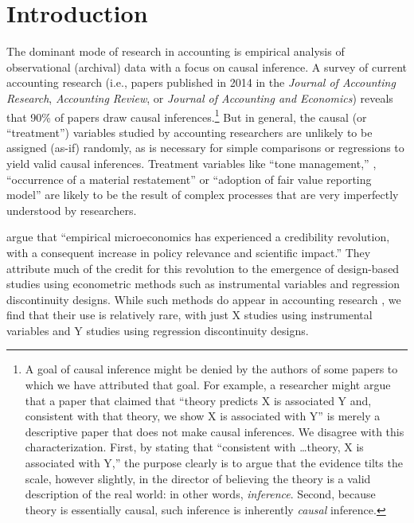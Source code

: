 \section{Introduction}

The dominant mode of research in accounting is empirical analysis of observational (archival) data with a focus on causal inference. A survey of current accounting research (i.e., papers published in 2014 in the \textit{Journal of Accounting Research}, \textit{Accounting Review}, or \textit{Journal of Accounting and Economics}) reveals that 90\% of papers draw causal inferences.\footnote{A goal of causal inference might be denied by the authors of some papers to which we have attributed that goal. 
For example, a researcher might argue that a paper that claimed that ``theory predicts X is associated Y and, consistent with that theory, we show X is associated with Y'' is merely a descriptive paper that does not make causal inferences. 
We disagree with this characterization. 
First, by stating that ``consistent with \dots theory, X is associated with Y,'' the purpose clearly is to argue that the evidence tilts the scale, however slightly, in the director of believing the theory is a valid description of the real world: in other words, \emph{inference}. 
Second, because theory is essentially causal, such inference is inherently \emph{causal} inference.} 
But in general, the causal (or ``treatment'') variables studied by accounting researchers are unlikely to be assigned (as-if) randomly, as is necessary for simple comparisons or regressions to yield valid causal inferences. Treatment variables like ``tone management,'' \citep{Huang:2014cs}, ``occurrence of a material restatement'' \citep{Chen:2014ji} or ``adoption of fair value reporting model'' \citep{Liang:2014ea} are likely to be the result of complex processes that are very imperfectly understood by researchers.

\cite{Angrist:2010jv} argue that ``empirical microeconomics has experienced a credibility revolution, with a consequent increase in policy relevance and scientific impact.'' They attribute much of the credit for this revolution to the emergence of design-based studies using econometric methods such as instrumental variables and regression discontinuity designs. While such methods do appear in accounting research \citep{Larcker:2010fq}, we find that their use is relatively rare, with just X studies using instrumental variables and Y studies using regression discontinuity designs.

